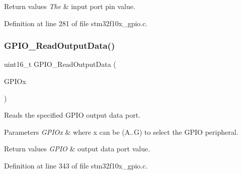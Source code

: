 \begin{DoxyRetVals}{Return values}
{\em The} & input port pin value. \\
\hline
\end{DoxyRetVals}


Definition at line 281 of file stm32f10x\+\_\+gpio.\+c.

\mbox{\label{group___g_p_i_o___private___functions_gaf8938a34280b7dc3e39872a7c17bb323}} 
\subsubsection{\texorpdfstring{G\+P\+I\+O\+\_\+\+Read\+Output\+Data()}{GPIO\_ReadOutputData()}}
{\footnotesize\ttfamily uint16\+\_\+t G\+P\+I\+O\+\_\+\+Read\+Output\+Data (\begin{DoxyParamCaption}\item[{\hyperlink{struct_g_p_i_o___type_def}{G\+P\+I\+O\+\_\+\+Type\+Def} $\ast$}]{G\+P\+I\+Ox }\end{DoxyParamCaption})}



Reads the specified G\+P\+IO output data port. 


\begin{DoxyParams}{Parameters}
{\em G\+P\+I\+Ox} & where x can be (A..G) to select the G\+P\+IO peripheral. \\
\hline
\end{DoxyParams}

\begin{DoxyRetVals}{Return values}
{\em G\+P\+IO} & output data port value. \\
\hline
\end{DoxyRetVals}


Definition at line 343 of file stm32f10x\+\_\+gpio.\+c.

\mbox{\label{group___g_p_i_o___private___functions_ga138270f8695b105b7c6ed405792919c1}} 
